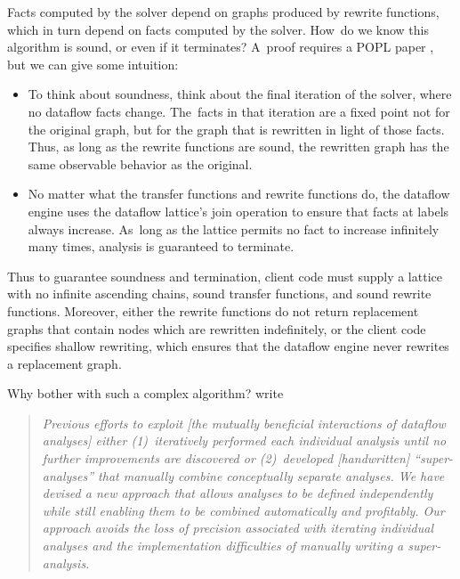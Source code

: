 \documentclass[blockstyle,preprint,nocopyrightspace]{sigplanconf}
\let\cite\citep
\newcommand{\authornote}[1]{{\em #1}}
\def\authornote#1{\unskip\relax}
\newcommand{\norman}[1]{\authornote{NR: #1}}
\let\remark\norman
\begin{document}
Facts computed by the solver depend on graphs produced by rewrite
functions, which in turn depend on facts computed by the solver.
How~do we know this algorithm is sound, or even if it terminates?
A~proof requires a POPL paper
\cite{lerner-grove-chambers:2002}, but we can give some
intuition:
\begin{itemize} 
\item
To think about soundness, think about the final iteration of the
solver, where no dataflow facts change.
The~facts in that iteration are a fixed point not for the original
graph, but for the graph that is rewritten in light of those facts.
Thus, as long as the rewrite functions are sound, the rewritten graph
has the same observable behavior as the original.
\item
No matter what the transfer functions and rewrite functions do,
the dataflow engine uses the dataflow lattice's join operation to ensure that
facts at labels always increase. 
As~long as the lattice permits no fact to increase infinitely many
times, analysis is guaranteed to terminate.
\end{itemize}
Thus to guarantee soundness and termination, client code must supply a
lattice with no infinite ascending chains, sound transfer functions,
and sound rewrite functions.
Moreover, either the rewrite functions do not return replacement graphs that contain
nodes which are rewritten indefinitely,
or the client code specifies shallow rewriting, which ensures that the
dataflow engine never rewrites a replacement graph.

Why bother with such a complex algorithm?
\remark{We could condense the quote}
\citet{lerner-grove-chambers:2002} write
\begin{quote}
\emph{Previous efforts to exploit [the mutually beneficial
interactions of dataflow analyses] either (1)~iteratively performed
each individual analysis until no further improvements are discovered
or (2)~developed [handwritten] ``super-analyses'' that manually
combine conceptually separate analyses. We have devised a new approach
that allows analyses to be defined independently while still enabling
them to be combined automatically and profitably. Our approach avoids
the loss of precision associated with iterating individual analyses
and the implementation difficulties of manually writing a
super-analysis.}
\end{quote}
\end{document}
